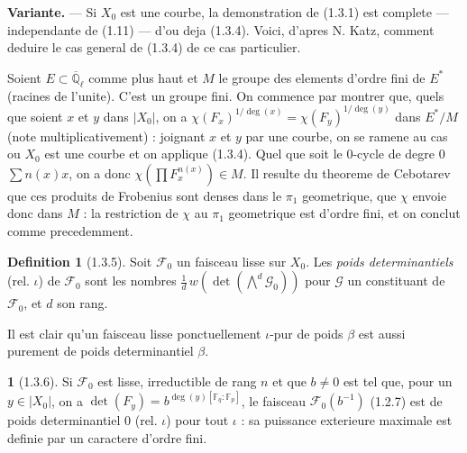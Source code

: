 \documentclass[12pt,a4paper]{article}
\theoremstyle{plain}
\theoremstyle{definition}
\newtheorem{definition}[theorem]{Definition}
\theoremstyle{definition}
\newtheorem{para}{}[section]
\theoremstyle{remark}
\begin{document}
\textbf{Variante.} --- Si $X_0$ est une courbe, la demonstration de (1.3.1) est complete --- independante de (1.11) --- d'ou deja (1.3.4). Voici, d'apres N. Katz, comment deduire le cas general de (1.3.4) de ce cas particulier.

Soient $E \subset \overline{\mathbb{Q}}_\ell$ comme plus haut et $M$ le groupe des elements d'ordre fini de $E^*$ (racines de l'unite). C'est un groupe fini. On commence par montrer que, quels que soient $x$ et $y$ dans $|X_0|$, on a $\chi(F_x)^{1/\deg(x)} = \chi(F_y)^{1/\deg(y)}$ dans $E^*/M$ (note multiplicativement) : joignant $x$ et $y$ par une courbe, on se ramene au cas ou $X_0$ est une courbe et on applique (1.3.4). Quel que soit le $0$-cycle de degre $0$ $\sum n(x)x$, on a donc $\chi(\prod F_x^{n(x)}) \in M$. Il resulte du theoreme de Cebotarev que ces produits de Frobenius sont denses dans le $\pi_1$ geometrique, que $\chi$ envoie donc dans $M$ : la restriction de $\chi$ au $\pi_1$ geometrique est d'ordre fini, et on conclut comme precedemment.

\begin{definition}[1.3.5]
Soit $\mathscr{F}_0$ un faisceau lisse sur $X_0$. Les \emph{poids determinantiels} (rel. $\iota$) de $\mathscr{F}_0$ sont les nombres $\frac{1}{d}\,w(\det(\bigwedge^d \mathscr{G}_0))$ pour $\mathscr{G}$ un constituant de $\mathscr{F}_0$, et $d$ son rang.

Il est clair qu'un faisceau lisse ponctuellement $\iota$-pur de poids $\beta$ est aussi purement de poids determinantiel $\beta$.
\end{definition}

\begin{para}[1.3.6]
Si $\mathscr{F}_0$ est lisse, irreductible de rang $n$ et que $b \neq 0$ est tel que, pour un $y \in |X_0|$, on a $\det(F_y) = b^{\deg(y)[\mathbb{F}_q : \mathbb{F}_p]}$, le faisceau $\mathscr{F}_0(b^{-1})$ (1.2.7) est de poids determinantiel $0$ (rel. $\iota$) pour tout $\iota$ : sa puissance exterieure maximale est definie par un caractere d'ordre fini.
\end{para}
\end{document}
